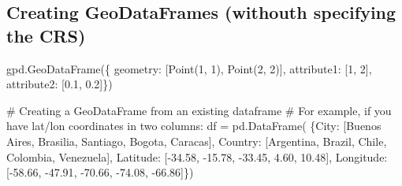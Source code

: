 \documentclass[
  letterpaper,
  DIV=11,
  numbers=noendperiod]{scrreprt}
\newenvironment{Shaded}{\begin{snugshade}}{\end{snugshade}}
\newcommand{\CommentTok}[1]{\textcolor[rgb]{0.37,0.37,0.37}{#1}}
\newcommand{\DecValTok}[1]{\textcolor[rgb]{0.68,0.00,0.00}{#1}}
\newcommand{\FloatTok}[1]{\textcolor[rgb]{0.68,0.00,0.00}{#1}}
\newcommand{\NormalTok}[1]{\textcolor[rgb]{0.00,0.23,0.31}{#1}}
\newcommand{\OperatorTok}[1]{\textcolor[rgb]{0.37,0.37,0.37}{#1}}
\newcommand{\StringTok}[1]{\textcolor[rgb]{0.13,0.47,0.30}{#1}}
\begin{document}
\hypertarget{creating-geodataframes-withouth-specifying-the-crs}{%
\subsection{Creating GeoDataFrames (withouth specifying the
CRS)}\label{creating-geodataframes-withouth-specifying-the-crs}}

\begin{Shaded}
\begin{Highlighting}[]
\NormalTok{gpd.GeoDataFrame(\{}
    \StringTok{\textquotesingle{}geometry\textquotesingle{}}\NormalTok{: [Point(}\DecValTok{1}\NormalTok{, }\DecValTok{1}\NormalTok{), Point(}\DecValTok{2}\NormalTok{, }\DecValTok{2}\NormalTok{)],}
    \StringTok{\textquotesingle{}attribute1\textquotesingle{}}\NormalTok{: [}\DecValTok{1}\NormalTok{, }\DecValTok{2}\NormalTok{],}
    \StringTok{\textquotesingle{}attribute2\textquotesingle{}}\NormalTok{: [}\FloatTok{0.1}\NormalTok{, }\FloatTok{0.2}\NormalTok{]\})}
\end{Highlighting}
\end{Shaded}

\begin{Shaded}
\begin{Highlighting}[]
\CommentTok{\# Creating a GeoDataFrame from an existing dataframe}
\CommentTok{\# For example, if you have lat/lon coordinates in two columns:}
\NormalTok{df }\OperatorTok{=}\NormalTok{ pd.DataFrame(}
\NormalTok{    \{}\StringTok{\textquotesingle{}City\textquotesingle{}}\NormalTok{: [}\StringTok{\textquotesingle{}Buenos Aires\textquotesingle{}}\NormalTok{, }\StringTok{\textquotesingle{}Brasilia\textquotesingle{}}\NormalTok{, }\StringTok{\textquotesingle{}Santiago\textquotesingle{}}\NormalTok{, }\StringTok{\textquotesingle{}Bogota\textquotesingle{}}\NormalTok{, }\StringTok{\textquotesingle{}Caracas\textquotesingle{}}\NormalTok{],}
     \StringTok{\textquotesingle{}Country\textquotesingle{}}\NormalTok{: [}\StringTok{\textquotesingle{}Argentina\textquotesingle{}}\NormalTok{, }\StringTok{\textquotesingle{}Brazil\textquotesingle{}}\NormalTok{, }\StringTok{\textquotesingle{}Chile\textquotesingle{}}\NormalTok{, }\StringTok{\textquotesingle{}Colombia\textquotesingle{}}\NormalTok{, }\StringTok{\textquotesingle{}Venezuela\textquotesingle{}}\NormalTok{],}
     \StringTok{\textquotesingle{}Latitude\textquotesingle{}}\NormalTok{: [}\OperatorTok{{-}}\FloatTok{34.58}\NormalTok{, }\OperatorTok{{-}}\FloatTok{15.78}\NormalTok{, }\OperatorTok{{-}}\FloatTok{33.45}\NormalTok{, }\FloatTok{4.60}\NormalTok{, }\FloatTok{10.48}\NormalTok{],}
     \StringTok{\textquotesingle{}Longitude\textquotesingle{}}\NormalTok{: [}\OperatorTok{{-}}\FloatTok{58.66}\NormalTok{, }\OperatorTok{{-}}\FloatTok{47.91}\NormalTok{, }\OperatorTok{{-}}\FloatTok{70.66}\NormalTok{, }\OperatorTok{{-}}\FloatTok{74.08}\NormalTok{, }\OperatorTok{{-}}\FloatTok{66.86}\NormalTok{]\})}
\end{Highlighting}
\end{Shaded}
\end{document}
